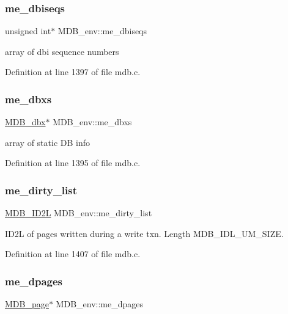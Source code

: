 \subsubsection{\texorpdfstring{me\+\_\+dbiseqs}{me\_dbiseqs}}
{\footnotesize\ttfamily unsigned int$\ast$ M\+D\+B\+\_\+env\+::me\+\_\+dbiseqs}

array of dbi sequence numbers 

Definition at line 1397 of file mdb.\+c.

\mbox{\label{struct_m_d_b__env_a3de13263d5176b1985c3581c4c728ed7}} 
\subsubsection{\texorpdfstring{me\+\_\+dbxs}{me\_dbxs}}
{\footnotesize\ttfamily \mbox{\hyperlink{struct_m_d_b__dbx}{M\+D\+B\+\_\+dbx}}$\ast$ M\+D\+B\+\_\+env\+::me\+\_\+dbxs}

array of static DB info 

Definition at line 1395 of file mdb.\+c.

\mbox{\label{struct_m_d_b__env_a42dac152902b215639f9c8468b16608c}} 
\subsubsection{\texorpdfstring{me\+\_\+dirty\+\_\+list}{me\_dirty\_list}}
{\footnotesize\ttfamily \mbox{\hyperlink{group__idls_gafcc5d61c06c726db2be5d088dbc68d51}{M\+D\+B\+\_\+\+I\+D2L}} M\+D\+B\+\_\+env\+::me\+\_\+dirty\+\_\+list}

I\+D2L of pages written during a write txn. Length M\+D\+B\+\_\+\+I\+D\+L\+\_\+\+U\+M\+\_\+\+S\+I\+ZE. 

Definition at line 1407 of file mdb.\+c.

\mbox{\label{struct_m_d_b__env_aeeb32fbf8557f37a933c762f391090ce}} 
\subsubsection{\texorpdfstring{me\+\_\+dpages}{me\_dpages}}
{\footnotesize\ttfamily \mbox{\hyperlink{struct_m_d_b__page}{M\+D\+B\+\_\+page}}$\ast$ M\+D\+B\+\_\+env\+::me\+\_\+dpages}

